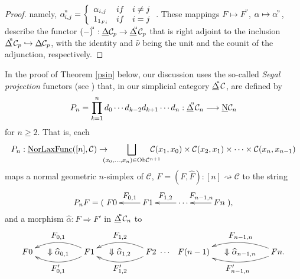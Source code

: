 \documentclass[]{amsart}
\begin{document}
\begin{proof}
namely, $\alpha\hspace{-1pt}^{^{_\mathrm{u}}}_{i,j}=\left\{\begin{array}{lcl}
  \alpha_{i,j} & if & i\neq j   \\
  1_{1_{Fi}} & if & i=j  \\
\end{array} \right.$. These mappings $F\mapsto F^{^\mathrm{u}}$, $\alpha \mapsto \alpha\hspace{-1pt}^{^{_\mathrm{u}}}$, describe
  the functor $(-)\hspace{-2pt}^{^\mathrm{u}}:{\ensuremath{\underline{\Delta}}}{\ensuremath{\mathcal{C}}}_p\to {\ensuremath{\underline{\Delta}}}\hspace{-3pt}^{^\mathrm{u}}{\ensuremath{\mathcal{C}}}_p$ that
   is right adjoint to the inclusion ${\ensuremath{\underline{\Delta}}}\hspace{-3pt}^{^\mathrm{u}}{\ensuremath{\mathcal{C}}}_p\hookrightarrow {\ensuremath{\underline{\Delta}}}{\ensuremath{\mathcal{C}}}_p$, with the identity
    and $\widehat{\nu}$ being the unit and the counit of the adjunction, respectively.
\end{proof}

In the proof of  Theorem \ref{psin} below, our discussion uses the so-called {\em Segal projection}
functors
 (see \cite[Definition 1.2]{segal74})
that, in our simplicial category ${\ensuremath{\underline{\Delta}}}\hspace{-3pt}^{^\mathrm{u}}{\ensuremath{\mathcal{C}}}$, are defined by
$$
 P_n=\prod_{k=1}^n d_0\cdots d_{k-2} d_{k+1}\cdots d_n :{\ensuremath{\underline{\Delta}}}\hspace{-3pt}^{^\mathrm{u}}{\ensuremath{\mathcal{C}}}_n\longrightarrow
{\ensuremath{\underline{\mathrm{N}}}}{\ensuremath{\mathcal{C}}}_n
$$
for $n\geq 2$. That is, each
$$
P_n:{\ensuremath{\underline{\mathrm{NorLaxFunc}}}}([n],{\ensuremath{\mathcal{C}}})\to\hspace{-0.3cm}\bigsqcup_{(x_0,\ldots,x_n)\in \mbox{\scriptsize
Ob}{\ensuremath{\mathcal{C}}}^{n+1}}\hspace{-0.5cm} {\ensuremath{\mathcal{C}}}(x_1,x_0)\times{\ensuremath{\mathcal{C}}}(x_2,x_1)\times\cdots\times{\ensuremath{\mathcal{C}}}(x_n,x_{n-1})
$$
maps a normal geometric $n$-simplex of ${\ensuremath{\mathcal{C}}}$, $F=(F,\widehat{F}):[n]\rightsquigarrow{\ensuremath{\mathcal{C}}}$ to the
string
$$
P_nF=(\xymatrix@C=25pt{F0&\ar[l]_-{\textstyle F_{0,1}}F1&\ar[l]_{\textstyle F_{1,2}}\cdots&\ar[l]_{
\textstyle F_{n-1,n}}Fn}),
$$
and a morphism  $\widehat{\alpha}:F\Rightarrow F'$ in ${\ensuremath{\underline{\Delta}}}\hspace{-3pt}^{^\mathrm{u}}{\ensuremath{\mathcal{C}}}_n$ to
$$
\xymatrix @C=1pc {F0  & {\Downarrow\widehat{\alpha}_{0,1}} & F1 \ar@/^1pc/[ll]^{\textstyle
F'_{0,1}} \ar@/_1pc/[ll]_-{\textstyle F_{0,1}} & {\Downarrow \widehat{\alpha}_{1,2}} & F2
\ar@/^1pc/[ll]^{\textstyle F'_{1,2}} \ar@/_1pc/[ll]_-{\textstyle
F_{1,2}}&\hspace{-15pt}\cdots&\hspace{-10pt}
 F(n-1)
  & {\Downarrow\widehat{\alpha}_{n-1,n}} & Fn.
\ar@/^1pc/[ll]^{\textstyle F'_{n-1,n}} \ar@/_1pc/[ll]_-{\textstyle F_{n-1,n}}}
$$
\end{document}
